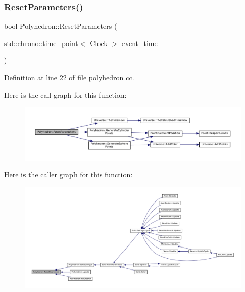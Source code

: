 \subsubsection{\texorpdfstring{Reset\+Parameters()}{ResetParameters()}}
{\footnotesize\ttfamily bool Polyhedron\+::\+Reset\+Parameters (\begin{DoxyParamCaption}\item[{std\+::chrono\+::time\+\_\+point$<$ \mbox{\hyperlink{universe_8h_a0ef8d951d1ca5ab3cfaf7ab4c7a6fd80}{Clock}} $>$}]{event\+\_\+time }\end{DoxyParamCaption})}



Definition at line 22 of file polyhedron.\+cc.

Here is the call graph for this function\+:\nopagebreak
\begin{figure}[H]
\begin{center}
\leavevmode
\includegraphics[width=350pt]{class_polyhedron_ae90c347cfb8ca8028a260e88bef2b45c_cgraph}
\end{center}
\end{figure}
Here is the caller graph for this function\+:\nopagebreak
\begin{figure}[H]
\begin{center}
\leavevmode
\includegraphics[width=350pt]{class_polyhedron_ae90c347cfb8ca8028a260e88bef2b45c_icgraph}
\end{center}
\end{figure}
\mbox{\label{class_polyhedron_ad74a1ccc28a08bc2dbc186e5f2c1f694}} 
